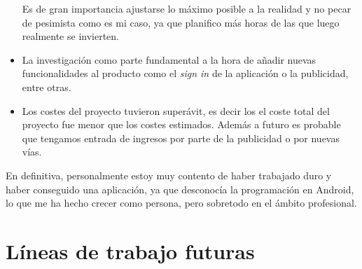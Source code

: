 \begin{itemize}
	Es de gran importancia ajustarse lo máximo posible a la realidad y no pecar de pesimista como es mi caso, ya que planifico más horas de las que luego realmente se invierten.
	
	\item La investigación como parte fundamental a la hora de añadir nuevas funcionalidades al producto como el \emph{sign in} de la aplicación o la publicidad, entre otras.
	
	\item Los costes del proyecto tuvieron superávit, es decir los el coste total del proyecto fue menor que los costes estimados. Además a futuro es probable que tengamos entrada de ingresos por parte de la publicidad o por nuevas vías.
	
\end{itemize}

En definitiva, personalmente estoy muy contento de haber trabajado duro y haber conseguido una aplicación, ya que desconocía la programación en Android, lo que me ha hecho crecer como persona, pero sobretodo en el ámbito profesional.


\section{Líneas de trabajo futuras}


